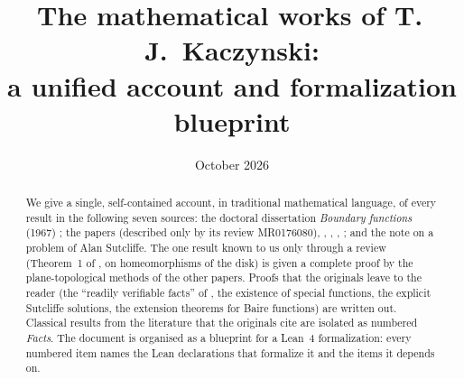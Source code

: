 \documentclass[11pt,reqno]{amsart}
\title{The mathematical works of T.\,J.~Kaczynski:\\ a unified account and formalization blueprint}
\date{October 2026}
\theoremstyle{definition}
\theoremstyle{remark}
\numberwithin{equation}{section}
\begin{document}
\begin{abstract}
We give a single, self-contained account, in traditional mathematical language, of every result in
the following seven sources: the doctoral dissertation \emph{Boundary functions} (1967) \cite{Diss};
the papers \cite{JMM} (described only by its review MR0176080), \cite{MMJ}, \cite{TAMSa},
\cite{TAMSb}, \cite{PAMS}; and the note \cite{MathMag} on a problem of Alan Sutcliffe. The one
result known to us only through a review (Theorem~1 of \cite{JMM}, on homeomorphisms of the disk) is
given a complete proof by the plane-topological methods of the other papers. Proofs that the
originals leave to the reader (the ``readily verifiable facts'' of \cite{TAMSb}, the existence of
special functions, the explicit Sutcliffe solutions, the extension theorems for Baire functions) are
written out. Classical results from the literature that the originals cite are isolated as numbered
\emph{Facts}. The document is organised as a blueprint for a Lean~4 formalization: every numbered
item names the Lean declarations that formalize it and the items it depends on.
\end{abstract}

\maketitle
\tableofcontents













\end{document}
